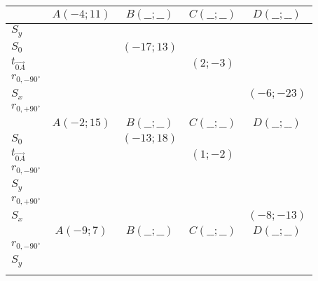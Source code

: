 \begin{table}[h!]
	\centering
	\renewcommand{\arraystretch}{3}
	\begin{tabular}{|>{\bfseries}l|c|c|c|c|}
		\hline
		\versions
		{ %
		                          & $A(-4; 11)$ & $B(\_\_; \_\_)$ & $C(\_\_; \_\_)$ & $D(\_\_; \_\_)$ \\ \hline
		$S_y$                     &             &                 &                 &                 \\ \hline
		$S_0$                     &             & $(-17; 13)$     &                 &                 \\ \hline
		$t_{\overrightarrow{0A}}$ &             &                 & $(2; -3)$       &                 \\ \hline
		$r_{0, -90^\circ}$        &             &                 &                 &                 \\ \hline
		$S_x$                     &             &                 &                 & $(-6 ; -23)$    \\ \hline
		$r_{0, +90^\circ}$        &             &                 &                 &                 \\ \hline
		}
		{ %
		                          & $A(-2; 15)$ & $B(\_\_; \_\_)$ & $C(\_\_; \_\_)$ & $D(\_\_; \_\_)$ \\ \hline
		$S_0$                     &             & $(-13; 18)$     &                 &                 \\ \hline
		$t_{\overrightarrow{0A}}$ &             &                 & $(1; -2)$       &                 \\ \hline
		$r_{0, -90^\circ}$        &             &                 &                 &                 \\ \hline
		$S_y$                     &             &                 &                 &                 \\ \hline
		$r_{0, +90^\circ}$        &             &                 &                 &                 \\ \hline
		$S_x$                     &             &                 &                 & $(-8 ; -13)$    \\ \hline
		}
		{ %
		                          & $A(-9; 7)$  & $B(\_\_; \_\_)$ & $C(\_\_; \_\_)$ & $D(\_\_; \_\_)$ \\ \hline
		$r_{0, -90^\circ}$        &             &                 &                 &                 \\ \hline
		$S_y$                     &             &                 &                 &                 \\ \hline
}
\end{tabular}
\end{table}
